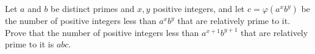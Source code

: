 Let $a$ and $b$ be distinct primes and $x,y$ positive integers, and let $c=\varphi\left(a^xb^y\right)$ be the number of positive integers less than $a^xb^y$ that are relatively prime to it. Prove that the number of positive integers less than $a^{x+1}b^{y+1}$ that are relatively prime to it is $abc$.

